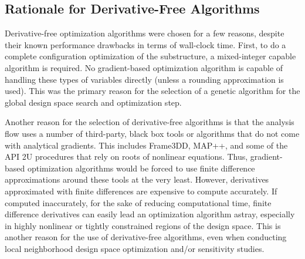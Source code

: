 \subsection{Rationale for Derivative-Free Algorithms}
Derivative-free optimization algorithms were chosen for a few reasons,
despite their known performance drawbacks in terms of wall-clock time.
First, to do a complete configuration optimization of the substructure,
a mixed-integer capable algorithm is required.  No gradient-based
optimization algorithm is capable of handling these types of variables
directly (unless a rounding approximation is used).  This was the
primary reason for the selection of a genetic algorithm for the global
design space search and optimization step.

Another reason for the selection of derivative-free algorithms is that
the analysis flow uses a number of third-party, black box tools or
algorithms that do not come with analytical gradients.  This includes
Frame3DD, MAP++, and some of the API 2U procedures that rely on roots of
nonlinear equations.  Thus, gradient-based optimization algorithms would
be forced to use finite difference approximations around these tools at
the very least.  However, derivatives approximated with finite
differences are expensive to compute accurately.  If computed
inaccurately, for the sake of reducing computational time, finite
difference derivatives can easily lead an optimization algorithm astray,
especially in highly nonlinear or tightly constrained regions of the
design space.  This is another reason for the use of
derivative-free algorithms, even when conducting local neighborhood
design space optimization and/or sensitivity studies.

